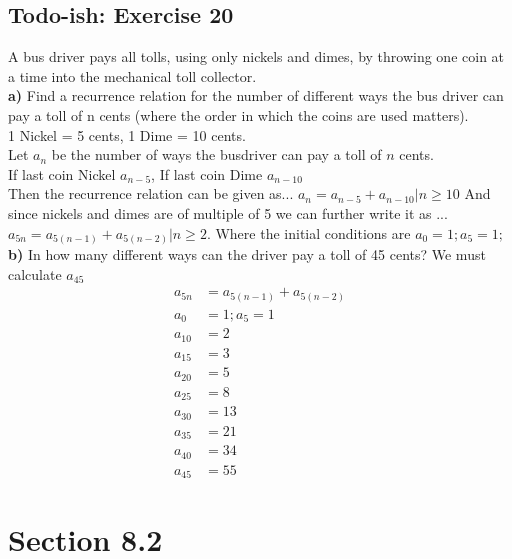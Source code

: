 \documentclass[12pt]{article}
\begin{document}
    \subsection{Todo-ish: Exercise 20}
    A bus driver pays all tolls, using only nickels and dimes, by throwing one coin at a time into the mechanical toll collector.\\
    \textbf{a)} Find a recurrence relation for the number of different ways the bus driver can pay a toll of n cents (where the order in which the coins are used matters).\\
    1 Nickel =  5 cents, 1 Dime = 10 cents.\\
    Let $a_n$ be the number of ways the busdriver can pay a toll of $n$ cents.\\
    If last coin Nickel $a_{n-5}$, If last coin Dime $a_{n-10}$\\
    Then the recurrence relation can be given as...
    $a_n=a_{n-5}+a_{n-10} | n \geq 10$
    And since nickels and dimes are of multiple of 5 we can further write it as ...
    $a_{5n}=a_{5(n-1)} + a_{5(n-2)} | n \geq 2$.
    Where the initial conditions are $a_0=1; a_5=1;$
    \textbf{b)} In how many different ways can the driver pay a toll of 45 cents?
    We must calculate $a_{45}$
    \begin{equation}
        \begin{split}
            a_{5n}&=a_{5(n-1)} + a_{5(n-2)}\\
            a_0&=1; a_5=1\\
            a_{10}&=2\\
            a_{15}&=3\\
            a_{20}&=5\\
            a_{25}&=8\\
            a_{30}&=13\\
            a_{35}&=21\\
            a_{40}&=34\\
            a_{45}&=55
        \end{split}
    \end{equation}

    \section{Section 8.2} 
    
\end{document}
